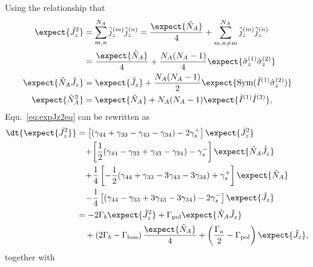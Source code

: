 Using the relationship that 
\begin{align}
\expect{\hat{J}_z^2} &= \sum_{m,n}^{N_A} \hat{j}_z^{(m)}\hat{j}_z^{(n)} = \frac{\expect{\hat{N}_A}}{4} + \sum_{m,n\neq m}^{N_A} \hat{j}_z^{(m)}\hat{j}_z^{(n)}\\
&= \frac{\expect{\hat{N}_A}}{4} + \frac{N_A(N_A-1)}{4} \expect{\hat{\sigma}_z^{(1)} \hat{\sigma}_z^{(2)}}\\
\expect{\hat{N}_A \hat{J}_z} &= \expect{\hat{J}_z } + \frac{N_A(N_A-1)}{2} \expect{\mathrm{Sym}(\hat{I}^{(1)}\hat{\sigma}_z^{(2)} ) }\\
\expect{\hat{N}_A^2} &= \expect{\hat{N}_A} + N_A(N_A-1)\expect{\hat{I}^{(1)}\hat{I}^{(2)}},
\end{align}
Equ.~\eqref{eq:expJz2eq} can be rewritten as
\begin{align}
\dt{\expect{\hat{J}_z^2}} &=\left[ (\gamma_{44}+\gamma_{33}-\gamma_{43}-\gamma_{34})  -2\gamma_s^+\right]\expect{\hat{J}_z^2} \nonumber\\
&\quad \!+\!  \left[ \frac{1}{2}(\gamma_{44}-\gamma_{33}+\gamma_{43}-\gamma_{34})  -\gamma_s^-\right]\expect{\hat{N}_{A}\hat{J}_z } \nonumber\\
&\quad \!+\!  \frac{1}{4}\left[ -\frac{1}{2} (\gamma_{44}+\gamma_{33} - 3\gamma_{43} -3\gamma_{34})  +\gamma_s^+\right]\expect{\hat{N}_A} \nonumber\\
&\quad \!-\! \frac{1}{4} \left[  (\gamma_{44}-\gamma_{33}+3\gamma_{43}-3\gamma_{34})  -2\gamma_s^-\right] \expect{\hat{J}_z}\\
&= -2\Gamma_b\expect{\hat{J}_z^2}+\Gamma_{\rm pol}\expect{\hat{N}_{A}\hat{J}_z }\nonumber\\
&\quad +\left(2\Gamma_b-\Gamma_{\rm loss} \right)\frac{\expect{\hat{N}_A}}{4} +\left(\frac{\Gamma_a}{2}-\Gamma_{\rm pol} \right) \expect{\hat{J}_z},\label{eq:expJz2eq_op}
\end{align}
together with

